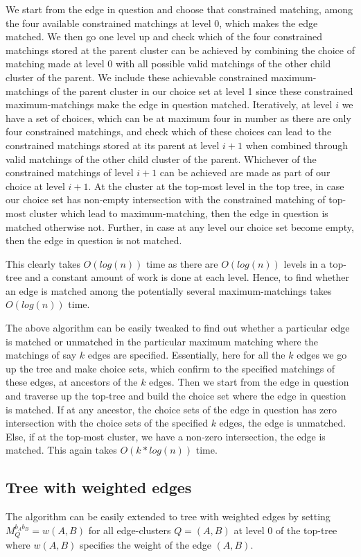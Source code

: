 \documentclass[a4paper,12pt]{article}
\begin{document}
We start from the edge in question and choose that constrained matching, among the four available constrained matchings at level 0, which makes the edge matched. We then go one level up and check which of the four constrained matchings stored at the parent cluster can be achieved by combining the choice of matching made at level 0 with all possible valid matchings of the other child cluster of the parent. We include these achievable constrained maximum-matchings of the parent cluster in our choice set at level 1 since these constrained maximum-matchings make the edge in question matched. Iteratively, at level $i$ we have a set of choices, which can be at maximum four in number as there are only four constrained matchings, and check which of these choices can lead to the constrained matchings stored at its parent at level $i+1$ when combined through valid matchings of the other child cluster of the parent. Whichever of the constrained matchings of level $i+1$ can be achieved are made as part of our choice at level $i+1$. At the cluster at the top-most level in the top tree, in case our choice set has non-empty intersection with the constrained matching of top-most cluster which lead to maximum-matching, then the edge in question is matched otherwise not. Further, in case at any level our choice set become empty, then the edge in question is not matched.

This clearly takes $O(log(n))$ time as there are $O(log(n))$ levels in a top-tree and a constant amount of work is done at each level. Hence, to find whether an edge is matched among the potentially several maximum-matchings takes $O(log(n))$ time. 

The above algorithm can be easily tweaked to find out whether a particular edge is matched or unmatched in the particular maximum matching where the matchings of say $k$ edges are specified. Essentially, here for all the $k$ edges we go up the tree and make choice sets, which confirm to the specified matchings of these edges, at ancestors of the $k$ edges. Then we start from the edge in question and traverse up the top-tree and build the choice set where the edge in question is matched. If at any ancestor, the choice sets of the edge in question has zero intersection with the choice sets of the specified $k$ edges, the edge is unmatched. Else, if at the top-most cluster, we have a non-zero intersection, the edge is matched. This again takes $O(k*log(n))$ time.

\subsection{Tree with weighted edges}
The algorithm can be easily extended to tree with weighted edges by setting $M_{Q}^{b_{A}b_{B}}=w(A,B)$ for all edge-clusters $Q=(A,B)$ at level 0 of the top-tree where $w(A,B)$ specifies the weight of the edge $(A,B)$.
\end{document}
